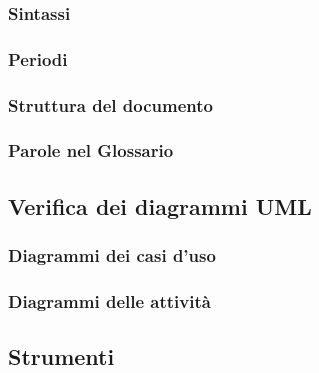 \documentclass[../NormeProgetto.tex]{subfiles}
\begin{document}
		\subsubsection{Sintassi}
		\subsubsection{Periodi}
		\subsubsection{Struttura del documento}
		\subsubsection{Parole nel Glossario}
	\subsection{Verifica dei diagrammi UML}
		\subsubsection{Diagrammi dei casi d'uso}
		\subsubsection{Diagrammi delle attività}
	\subsection{Strumenti}
\end{document}
